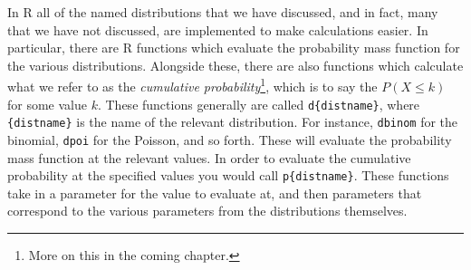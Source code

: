 \documentclass[
  letterpaper,
  DIV=11,
  numbers=noendperiod]{scrreprt}
\theoremstyle{definition}
\theoremstyle{definition}
\theoremstyle{definition}
\theoremstyle{remark}
\begin{document}
In R all of the named distributions that we have discussed, and in fact,
many that we have not discussed, are implemented to make calculations
easier. In particular, there are R functions which evaluate the
probability mass function for the various distributions. Alongside
these, there are also functions which calculate what we refer to as the
\emph{cumulative probability}\footnote{More on this in the coming
  chapter.}, which is to say the \(P(X\leq k)\) for some value \(k\).
These functions generally are called \texttt{d\{distname\}}, where
\texttt{\{distname\}} is the name of the relevant distribution. For
instance, \texttt{dbinom} for the binomial, \texttt{dpoi} for the
Poisson, and so forth. These will evaluate the probability mass function
at the relevant values. In order to evaluate the cumulative probability
at the specified values you would call \texttt{p\{distname\}}. These
functions take in a parameter for the value to evaluate at, and then
parameters that correspond to the various parameters from the
distributions themselves.
\end{document}
